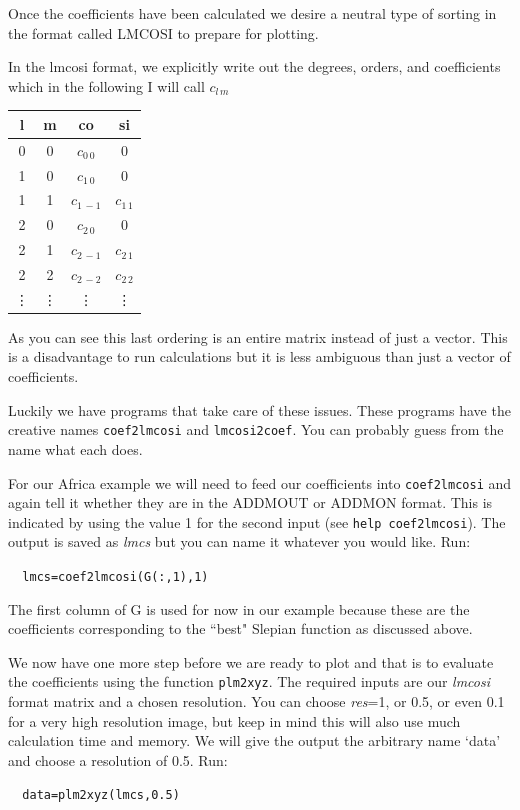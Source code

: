 \documentclass[11pt]{article}
\begin{document}
Once the coefficients have been calculated we desire a neutral type of sorting in the format called LMCOSI to prepare for plotting.

In the lmcosi format, we explicitly write out the degrees, orders, and coefficients which in the following I will call $c_{l\,m}$

\begin{tabular}{c c c c}
l&m&co&si\\
\hline
0&0&$c_{0\,0}$&0\\
1&0&$c_{1\,0}$&0\\
1&1&$c_{1\,-1}$&$c_{1\,1}$\\
2&0&$c_{2\,0}$&0\\
2&1&$c_{2\,-1}$&$c_{2\,1}$\\
2&2&$c_{2\,-2}$&$c_{2\,2}$\\
\vdots&\vdots&\vdots&\vdots
\end{tabular}

As you can see this last ordering is an entire matrix instead of just a vector. This is a disadvantage to run calculations but it is less ambiguous than just a vector of coefficients.

Luckily we have programs that take care of these issues. These programs have the creative names
\verb+coef2lmcosi+ and \verb+lmcosi2coef+. You can probably guess from the name what each does.

For our Africa example we will need to feed our coefficients into \verb+coef2lmcosi+ and again tell it whether they are in the ADDMOUT or ADDMON format. This is indicated by using the value 1 for the second input (see \verb+help coef2lmcosi+). The output is saved as \textit{lmcs} but you can name it whatever you would like. Run:

\verb+	lmcs=coef2lmcosi(G(:,1),1)+

The first column of G is used for now in our example because these are the coefficients corresponding to the ``best" Slepian function as discussed above.

We now have one more step before we are ready to plot and that is to evaluate the coefficients using the function \verb+plm2xyz+. The required inputs are our \textit{lmcosi} format matrix and a chosen resolution. You can choose \textit{res}=1, or 0.5, or even 0.1 for a very high resolution image, but keep in mind this will also use much calculation time and memory.  We will give the output the arbitrary name `data' and choose  a resolution of 0.5. Run:

\verb+	data=plm2xyz(lmcs,0.5)+
\end{document}
